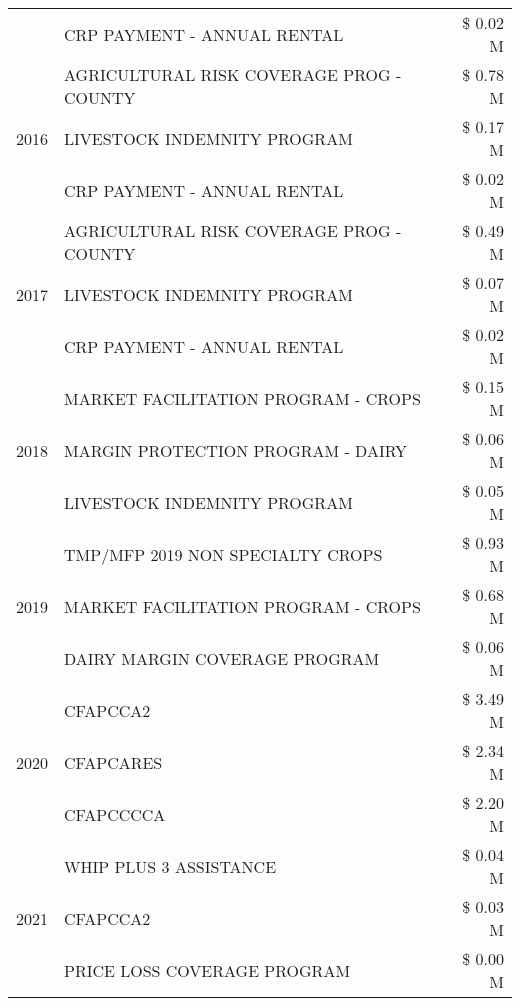 \begin{tabular}{llr}
 & CRP PAYMENT - ANNUAL RENTAL & \$ 0.02 M \\
\cline{1-3}
\multirow[t]{3}{*}{2016} & AGRICULTURAL RISK COVERAGE PROG - COUNTY & \$ 0.78 M \\
 & LIVESTOCK INDEMNITY PROGRAM & \$ 0.17 M \\
 & CRP PAYMENT - ANNUAL RENTAL & \$ 0.02 M \\
\cline{1-3}
\multirow[t]{3}{*}{2017} & AGRICULTURAL RISK COVERAGE PROG - COUNTY & \$ 0.49 M \\
 & LIVESTOCK INDEMNITY PROGRAM & \$ 0.07 M \\
 & CRP PAYMENT - ANNUAL RENTAL & \$ 0.02 M \\
\cline{1-3}
\multirow[t]{3}{*}{2018} & MARKET FACILITATION PROGRAM - CROPS & \$ 0.15 M \\
 & MARGIN PROTECTION PROGRAM - DAIRY & \$ 0.06 M \\
 & LIVESTOCK INDEMNITY PROGRAM & \$ 0.05 M \\
\cline{1-3}
\multirow[t]{3}{*}{2019} & TMP/MFP 2019 NON SPECIALTY CROPS & \$ 0.93 M \\
 & MARKET FACILITATION PROGRAM - CROPS & \$ 0.68 M \\
 & DAIRY MARGIN COVERAGE PROGRAM & \$ 0.06 M \\
\cline{1-3}
\multirow[t]{3}{*}{2020} & CFAPCCA2 & \$ 3.49 M \\
 & CFAPCARES & \$ 2.34 M \\
 & CFAPCCCCA & \$ 2.20 M \\
\cline{1-3}
\multirow[t]{3}{*}{2021} & WHIP PLUS 3 ASSISTANCE & \$ 0.04 M \\
 & CFAPCCA2 & \$ 0.03 M \\
 & PRICE LOSS COVERAGE PROGRAM & \$ 0.00 M \\
\cline{1-3}
\bottomrule
\end{tabular}
